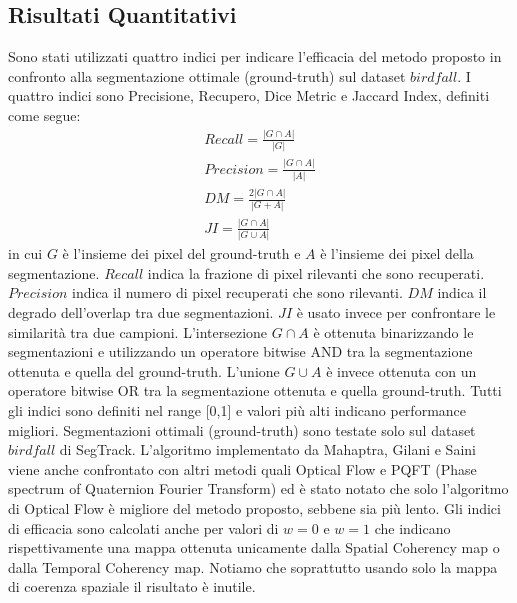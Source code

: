 \documentclass[12pt,twocolumn]{IEEEtran}
\begin{document}
		\subsection{Risultati Quantitativi}
			Sono stati utilizzati quattro indici per indicare l'efficacia del metodo proposto in confronto alla segmentazione ottimale (ground-truth) sul dataset $birdfall$. I quattro indici sono Precisione, Recupero, Dice Metric e Jaccard Index, definiti come segue:
			\begin{equation}
			\begin{aligned}
				Recall = \frac{|G \cap A|}{|G|} \\
				Precision = \frac{|G \cap A|}{|A|} \\
				DM = \frac{2|G \cap A|}{|G + A|} \\
				JI = \frac{|G \cap A|}{|G \cup A|}
			\end{aligned}
			\end{equation}
			in cui $G$ è l'insieme dei pixel del ground-truth e $A$ è l'insieme dei pixel della segmentazione. $Recall$ indica la frazione di pixel rilevanti che sono recuperati. $Precision$ indica il numero di pixel recuperati che sono rilevanti. $DM$ indica il degrado dell'overlap tra due segmentazioni. $JI$ è usato invece per confrontare le similarità tra due campioni. \newline
			L'intersezione $G \cap A$ è ottenuta binarizzando le segmentazioni e utilizzando un operatore bitwise AND tra la segmentazione ottenuta e quella del ground-truth. L'unione $G \cup A$ è invece ottenuta con un operatore bitwise OR tra la segmentazione ottenuta e quella ground-truth.\newline
			Tutti gli indici sono definiti nel range [0,1] e valori più alti indicano performance migliori. Segmentazioni ottimali (ground-truth) sono testate solo sul dataset $birdfall$ di SegTrack.\newline
			L'algoritmo implementato da Mahaptra, Gilani e Saini viene anche confrontato con altri metodi quali Optical Flow e PQFT (Phase spectrum of Quaternion Fourier Transform) ed è stato notato che solo l'algoritmo di Optical Flow è migliore del metodo proposto, sebbene sia più lento. \newline
			Gli indici di efficacia sono calcolati anche per valori di $w=0$ e $w=1$ che indicano rispettivamente una mappa ottenuta unicamente dalla Spatial Coherency map o dalla Temporal Coherency map. Notiamo che soprattutto usando solo la mappa di coerenza spaziale il risultato è inutile.\newline
			
\end{document}
